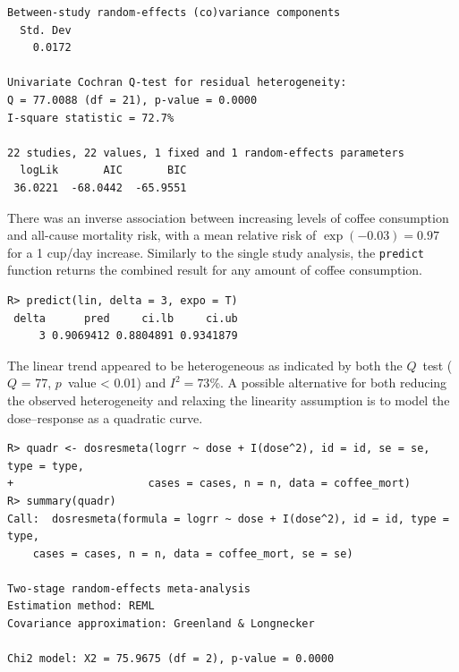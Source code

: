 \documentclass[11pt,a4paper,twoside,openany]{book}\usepackage{knitr}
\begin{document}
{{\begin{knitrout}
\begin{kframe}
\begin{verbatim}
Between-study random-effects (co)variance components
  Std. Dev
    0.0172

Univariate Cochran Q-test for residual heterogeneity:
Q = 77.0088 (df = 21), p-value = 0.0000
I-square statistic = 72.7%

22 studies, 22 values, 1 fixed and 1 random-effects parameters
  logLik       AIC       BIC  
 36.0221  -68.0442  -65.9551  
\end{verbatim}
\end{kframe}
\end{knitrout}

\noindent There was an inverse association between increasing levels of coffee consumption and all-cause mortality risk, with a mean relative risk of $\exp(-0.03) = 0.97$ for a 1 cup/day increase. Similarly to the single study analysis, the \texttt{predict} function returns the combined result for any amount of coffee consumption.
\begin{knitrout}\footnotesize
{}\color{fgcolor}\begin{kframe}
\begin{verbatim}
R> predict(lin, delta = 3, expo = T)
 delta      pred     ci.lb     ci.ub
     3 0.9069412 0.8804891 0.9341879
\end{verbatim}
\end{kframe}
\end{knitrout}

\noindent The linear trend appeared to be heterogeneous as indicated by both the $Q$~test ($Q$ = 77, $p$~value < 0.01) and $I^2 = 73$\%.
A possible alternative for both reducing the observed heterogeneity and relaxing the linearity assumption is to model the dose--response as a quadratic curve.
\begin{knitrout}\footnotesize
{}\color{fgcolor}\begin{kframe}
\begin{verbatim}
R> quadr <- dosresmeta(logrr ~ dose + I(dose^2), id = id, se = se, type = type,
+                     cases = cases, n = n, data = coffee_mort)
R> summary(quadr)
Call:  dosresmeta(formula = logrr ~ dose + I(dose^2), id = id, type = type, 
    cases = cases, n = n, data = coffee_mort, se = se)

Two-stage random-effects meta-analysis
Estimation method: REML
Covariance approximation: Greenland & Longnecker

Chi2 model: X2 = 75.9675 (df = 2), p-value = 0.0000


\end{verbatim}
\end{kframe}
\end{knitrout}}}
\end{document}
